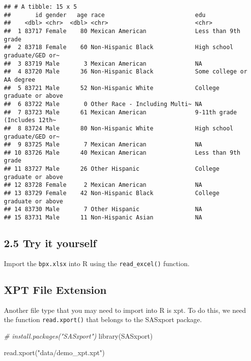 \documentclass[
]{book}
\newenvironment{Shaded}{\begin{snugshade}}{\end{snugshade}}
\newcommand{\CommentTok}[1]{\textcolor[rgb]{0.56,0.35,0.01}{\textit{#1}}}
\newcommand{\FunctionTok}[1]{\textcolor[rgb]{0.00,0.00,0.00}{#1}}
\newcommand{\NormalTok}[1]{#1}
\newcommand{\StringTok}[1]{\textcolor[rgb]{0.31,0.60,0.02}{#1}}
\begin{document}
\begin{verbatim}
## # A tibble: 15 x 5
##       id gender   age race                          edu
##    <dbl> <chr>  <dbl> <chr>                         <chr>
##  1 83717 Female    80 Mexican American              Less than 9th grade
##  2 83718 Female    60 Non-Hispanic Black            High school graduate/GED or~
##  3 83719 Male       3 Mexican American              NA
##  4 83720 Male      36 Non-Hispanic Black            Some college or AA degree
##  5 83721 Male      52 Non-Hispanic White            College graduate or above
##  6 83722 Male       0 Other Race - Including Multi~ NA
##  7 83723 Male      61 Mexican American              9-11th grade (Includes 12th~
##  8 83724 Male      80 Non-Hispanic White            High school graduate/GED or~
##  9 83725 Male       7 Mexican American              NA
## 10 83726 Male      40 Mexican American              Less than 9th grade
## 11 83727 Male      26 Other Hispanic                College graduate or above
## 12 83728 Female     2 Mexican American              NA
## 13 83729 Female    42 Non-Hispanic Black            College graduate or above
## 14 83730 Male       7 Other Hispanic                NA
## 15 83731 Male      11 Non-Hispanic Asian            NA
\end{verbatim}

\hypertarget{try-it-yourself-13}{%
\subsection{2.5 Try it yourself}\label{try-it-yourself-13}}

Import the \texttt{bpx.xlsx} into R using the \texttt{read\_excel()} function.

\hypertarget{xpt-file-extension}{%
\subsection{XPT File Extension}\label{xpt-file-extension}}

Another file type that you may need to import into R is xpt. To do this, we need the function \texttt{read.xport()} that belongs to the SASxport package.

\begin{Shaded}
\begin{Highlighting}[]
\CommentTok{\# install.packages("SASxport")}
\FunctionTok{library}\NormalTok{(SASxport)}

\FunctionTok{read.xport}\NormalTok{(}\StringTok{"data/demo\_xpt.xpt"}\NormalTok{)}
\end{Highlighting}
\end{Shaded}
\end{document}
